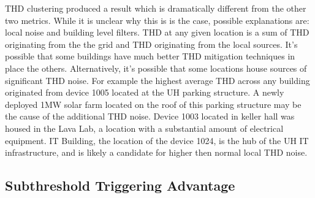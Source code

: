 THD clustering produced a result which is dramatically different from the other two metrics.
While it is unclear why this is is the case, possible explanations are: local noise and building level filters.
THD at any given location is a sum of THD originating from the the grid and THD originating from the local sources.
It's possible that some buildings have much better THD mitigation techniques in place the others.
Alternatively, it's possible that some locations house sources of significant THD noise.
For example the highest average THD across any building originated from device 1005 located at the UH parking structure.
A newly deployed 1MW solar farm located on the roof of this parking structure may be the cause of the additional THD noise.
Device 1003 located in keller hall was housed in the Lava Lab, a location with a substantial amount of electrical equipment.
IT Building, the location of the device 1024, is the hub of the UH IT infrastructure, and is likely a candidate for higher then normal local THD noise.


\subsection{Subthreshold Triggering Advantage}\label{subsec:subthreshold-triggering-advantage}


